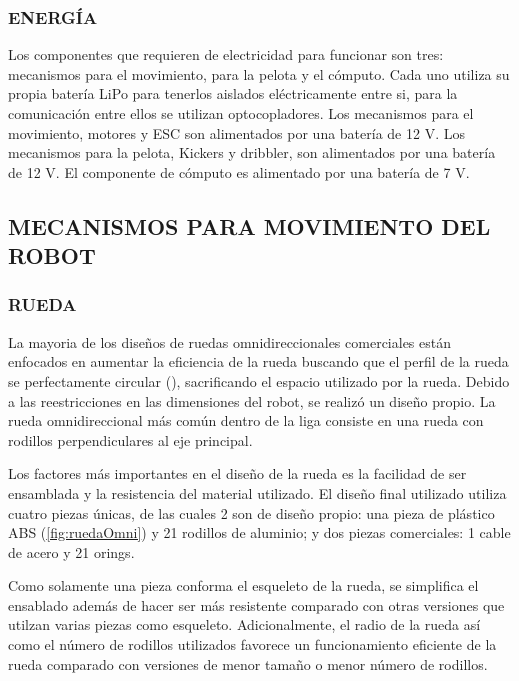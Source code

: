 \documentclass[twocolumn,10pt]{amrob}
\begin{document}
\subsubsection*{ENERGÍA}
Los componentes que requieren de electricidad para funcionar son tres: mecanismos para el movimiento, para la pelota y el cómputo. Cada uno utiliza su propia batería LiPo para tenerlos aislados eléctricamente entre si, para la comunicación entre ellos se utilizan optocopladores. Los mecanismos para el movimiento, motores y ESC son alimentados por una batería de 12 V. Los mecanismos para la pelota, Kickers y dribbler, son alimentados por una batería de 12 V. El componente de cómputo es alimentado por una batería de 7 V.
\subsection*{MECANISMOS PARA MOVIMIENTO DEL ROBOT}

\subsubsection*{RUEDA}
La mayoria de los diseños de ruedas omnidireccionales comerciales están enfocados en aumentar la eficiencia de la rueda buscando que el perfil de la rueda se perfectamente circular (\cite{rojasHist}), sacrificando el espacio utilizado por la rueda. Debido a las reestricciones en las dimensiones del robot, se realizó un diseño propio. La rueda omnidireccional más común dentro de la liga consiste en una rueda con rodillos perpendiculares al eje principal. \par

Los factores más importantes en el diseño de la rueda es la facilidad de ser ensamblada y la resistencia del material utilizado. El diseño final utilizado utiliza cuatro piezas únicas, de las cuales 2 son de diseño propio: una pieza de plástico ABS (\ref{fig:ruedaOmni}) y 21 rodillos de aluminio; y dos piezas comerciales: 1 cable de acero y 21 orings. \par

Como solamente una pieza conforma el esqueleto de la rueda, se simplifica el ensablado además de hacer ser más resistente comparado con otras versiones que utilzan varias piezas como esqueleto. Adicionalmente, el radio de la rueda así como el número de rodillos utilizados favorece un funcionamiento eficiente de la rueda comparado con versiones de menor tamaño o menor número de rodillos.\par
\end{document}
